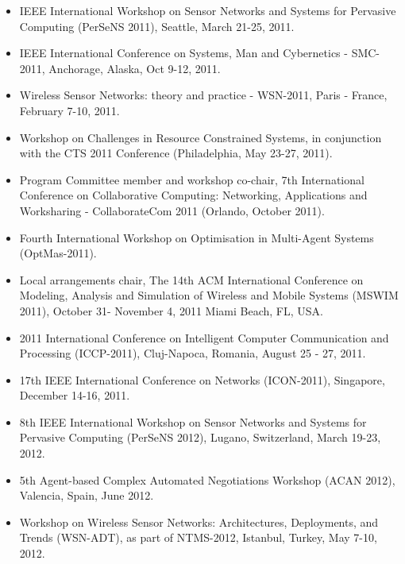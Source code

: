 \begin{itemize}
\item IEEE International Workshop
on Sensor Networks and Systems for Pervasive Computing (PerSeNS 2011),
Seattle, March 21-25, 2011.

\item IEEE International Conference on Systems, Man and Cybernetics - SMC-2011, Anchorage, Alaska, Oct 9-12, 2011.

\item Wireless Sensor Networks: theory and practice - WSN-2011, Paris - France, February 7-10, 2011.

\item Workshop on Challenges in Resource Constrained Systems, in conjunction with the CTS 2011 Conference (Philadelphia, May 23-27, 2011).

\item Program Committee member and workshop co-chair, 7th International Conference on Collaborative Computing: Networking, Applications and Worksharing - CollaborateCom 2011 (Orlando, October 2011).

\item Fourth International Workshop on Optimisation in Multi-Agent Systems (OptMas-2011).

\item Local arrangements chair,  The 14th ACM International Conference on Modeling, Analysis and Simulation of Wireless and Mobile Systems (MSWIM 2011), October 31- November 4, 2011
Miami Beach, FL, USA.

\item 2011 International Conference on Intelligent
Computer Communication and Processing (ICCP-2011), Cluj-Napoca, Romania, August 25 - 27, 2011.

\item 17th IEEE International Conference on Networks (ICON-2011), Singapore, December 14-16, 2011.

\item 8th IEEE International Workshop on Sensor Networks and Systems for Pervasive Computing (PerSeNS 2012), Lugano, Switzerland, March 19-23, 2012.

\item 5th Agent-based Complex Automated Negotiations Workshop (ACAN 2012), Valencia, Spain, June 2012.

\item Workshop on Wireless Sensor Networks: Architectures, Deployments, and Trends (WSN-ADT), as part of NTMS-2012, Istanbul, Turkey, May 7-10, 2012.


\end{itemize}
